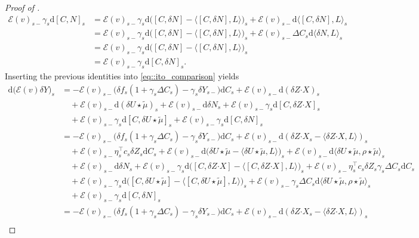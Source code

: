 \documentclass[10pt]{article} %
\newcommand\cE{\mathcal E}
\newcommand{\bcdot}{\boldsymbol{\cdot}}
\newcommand{\1}{\mathbf{1}}
\def\d{\mathrm{d}}
\begin{document}
\begin{proof}[Proof of ]
\begin{align*}
		\cE(v)_{s-}\gamma_s \d [C,N]_s 
		&= \cE(v)_{s-}\gamma_s \d \big([C,\delta N] - \big\langle [C,\delta N],L\big\rangle \big)_s + \cE(v)_{s-}\d\big\langle [C,\delta N],L\big\rangle_s \\
		&= \cE(v)_{s-}\gamma_s \d \big([C,\delta N] - \big\langle [C,\delta N],L\big\rangle \big)_s + \cE(v)_{s-}\Delta C_s\d\big\langle \delta N,L\big\rangle_s \\
		&= \cE(v)_{s-}\gamma_s \d \big([C,\delta N] - \big\langle [C,\delta N],L\big\rangle \big)_s \\
		&= \cE(v)_{s-}\gamma_s \d [C,\delta N]_s.
	\end{align*}
	Inserting the previous identities into \eqref{eq::ito_comparison} yields
	\begin{align}\label{eq::ito_comparison2}
		\d \big(\cE(v)\delta Y\big)_s 
		&= - \cE(v)_{s-} \big(\delta f_s(1+\gamma_s\Delta C_s) - \gamma_s\delta Y_{s-}\big)\d C_s + \cE(v)_{s-} \d(\delta Z \bcdot X)_s \nonumber\\
		&\quad + \cE(v)_{s-}\d (\delta U \star\tilde\mu)_s + \cE(v)_{s-}\d \delta N_s +\cE(v)_{s-}\gamma_s \d [C,\delta Z \bcdot X]_s \nonumber\\
		&\quad + \cE(v)_{s-}\gamma_s \d [C,\delta U \star\tilde\mu]_s + \cE(v)_{s-}\gamma_s \d [C,\delta N]_s \nonumber\\
		&= - \cE(v)_{s-} \big(\delta f_s(1+\gamma_s\Delta C_s) - \gamma_s\delta Y_{s-}\big)\d C_s + \cE(v)_{s-}\d (\delta Z \bcdot X_s - \langle \delta Z \bcdot X,L \rangle)_s \nonumber\\
		&\quad + \cE(v)_{s-} \eta^\top_s c_s\delta Z_s \d C_s + \cE(v)_{s-}\d\big(\delta U \star \tilde\mu - \langle \delta U \star\tilde\mu,L\rangle\big)_s + \cE(v)_{s-}\d \langle \delta U \star\tilde\mu,\rho\star\tilde\mu\rangle_s \nonumber\\
		&\quad + \cE(v)_{s-}\d \delta N_s + \cE(v)_{s-}\gamma_s \d\big([C,\delta Z \bcdot X]-\big\langle [C,\delta Z \bcdot X],L \big\rangle\big)_s + \cE(v)_{s-}\eta^\top_s c_s \delta Z_s \gamma_s \Delta C_s \d C_s \nonumber\\
		&\quad + \cE(v)_{s-}\gamma_s \d\big([C,\delta U \star\tilde\mu]-\big\langle [C,\delta U \star\tilde\mu],L \big\rangle\big)_s + \cE(v)_{s-}\gamma_s \Delta C_s \d\langle \delta U \star\tilde\mu,\rho\star\tilde\mu \rangle_s \nonumber\\
		&\quad + \cE(v)_{s-}\gamma_s \d [C,\delta N]_s \nonumber\\
		&= -  \cE(v)_{s-} \big(\delta f_s(1+\gamma_s\Delta C_s) - \gamma_s\delta Y_{s-}\big)\d C_s + \cE(v)_{s-}\d (\delta Z \bcdot X_s - \langle \delta Z \bcdot X,L \rangle)_s \nonumber\\

\end{align}
\end{proof}
\end{document}
